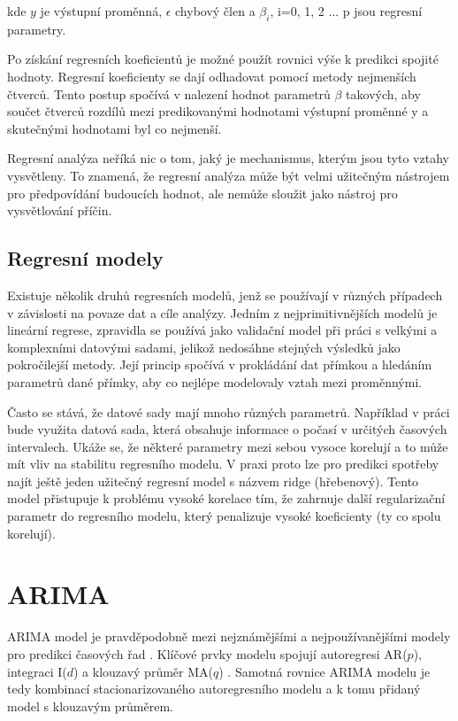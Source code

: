\documentclass[FM,BP,fonts]{tulthesis}
\begin{document}
kde $y$ je výstupní proměnná, $\epsilon$ chybový člen a $\beta_i$, i=0, 1, 2 ... p jsou regresní parametry.

Po získání regresních koeficientů je možné použít rovnici výše k predikci spojité hodnoty. Regresní koeficienty se dají odhadovat pomocí metody nejmenších čtverců. Tento postup spočívá v nalezení hodnot parametrů $\beta$ takových, aby součet čtverců rozdílů mezi predikovanými hodnotami výstupní proměnné y a skutečnými hodnotami byl co nejmenší. \cite{hanousek1992moderni}

Regresní analýza neříká nic o tom, jaký je mechanismus, kterým jsou tyto vztahy vysvětleny. To znamená, že regresní analýza může být velmi užitečným nástrojem pro předpovídání budoucích hodnot, ale nemůže sloužit jako nástroj pro vysvětlování příčin.

\subsection{Regresní modely}
Existuje několik druhů regresních modelů, jenž se používají v různých případech v závislosti na povaze dat a cíle analýzy. Jedním z nejprimitivnějších modelů je lineární regrese, zpravidla se používá jako validační model při práci s velkými a komplexními datovými sadami, jelikož nedosáhne stejných výsledků jako pokročilejší metody. Její princip spočívá v prokládání dat přímkou a hledáním parametrů dané přímky, aby co nejlépe modelovaly vztah mezi proměnnými.

Často se stává, že datové sady mají mnoho různých parametrů. Například v práci bude využita datová sada, která obsahuje informace o počasí v určitých časových intervalech. Ukáže se, že některé parametry mezi sebou vysoce korelují a to může mít vliv na stabilitu regresního modelu. V praxi proto lze pro predikci spotřeby najít ještě jeden užitečný regresní model s názvem ridge (hřebenový). Tento model přistupuje k problému vysoké korelace tím, že zahrnuje další regularizační parametr do regresního modelu, který penalizuje vysoké koeficienty (ty co spolu korelují).

\section{ARIMA}
ARIMA model je pravděpodobně mezi nejznámějšími a nejpoužívanějšími modely pro predikci časových řad \cite{RUPEL}. Klíčové prvky modelu spojují autoregresi AR($p$), integraci I($d$) a klouzavý průměr MA($q$) \cite{Brockwell2016-qt}. Samotná rovnice ARIMA modelu je tedy kombinací stacionarizovaného autoregresního modelu a k tomu přidaný model s klouzavým průměrem.
\end{document}
